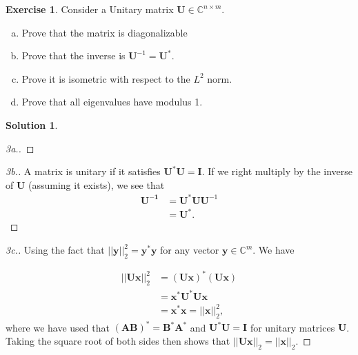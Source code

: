 \documentclass[12pt]{article}
\newcommand{\bbC}{\mathbb{C}}
\newcommand{\norm}[1]{ \left|\left| #1 \right|\right| }
\renewcommand{\vec}[1]{\mathbf{#1}}
\theoremstyle{definition}
\newtheorem{exer}{Exercise}
\newtheorem{sol}{Solution}
\theoremstyle{remark}
\begin{document}
\begin{exer}
    Consider a Unitary matrix $\vec{U} \in \bbC^{n \times m}$. 
    \begin{enumerate}[a.]
        \item Prove that the matrix is diagonalizable
    \item Prove that the inverse is $\vec{U}^{-1} = \vec{U}^*$.
    \item Prove it is isometric with respect to the $L^2$ norm.
    \item Prove that all eigenvalues have modulus 1.
\end{enumerate}
\end{exer}

\begin{sol}

\begin{proof}[3a.]
    
\end{proof}

\begin{proof}[3b.]
    A matrix is unitary if it satisfies $\vec{U}^*\vec{U} = \vec{I}$. If we right multiply by the inverse of $\vec{U}$ (assuming it exists), we see that
\begin{align}
    \vec{U^{-1}} &= \vec{U}^*\vec{U}\vec{U}^{-1}  \\
                 &= \vec{U}^*.
\end{align}
\end{proof}

\begin{proof}[3c.]
Using the fact that $\norm{\vec{y}}_2^2 = \vec{y}^*\vec{y}$ for any vector $\vec{y}\in\bbC^m$. We have

\begin{align}
    \norm{ \vec{Ux} }_2^2 &= (\vec{Ux})^*(\vec{Ux}) \\
                          &= \vec{x}^*\vec{U}^*\vec{Ux} \\
                          &= \vec{x}^*\vec{x} = \norm{\vec{x}}_2^2,
\end{align}
where we have used that $(\vec{AB})^* = \vec{B}^*\vec{A}^*$ and $\vec{U}^*\vec{U} = \vec{I}$ for unitary matrices $\vec{U}$.
Taking the square root of both sides then shows that $\norm{ \vec{Ux} }_2 = \norm{\vec{x}}_2$.
\end{proof}


\end{sol}
\end{document}
